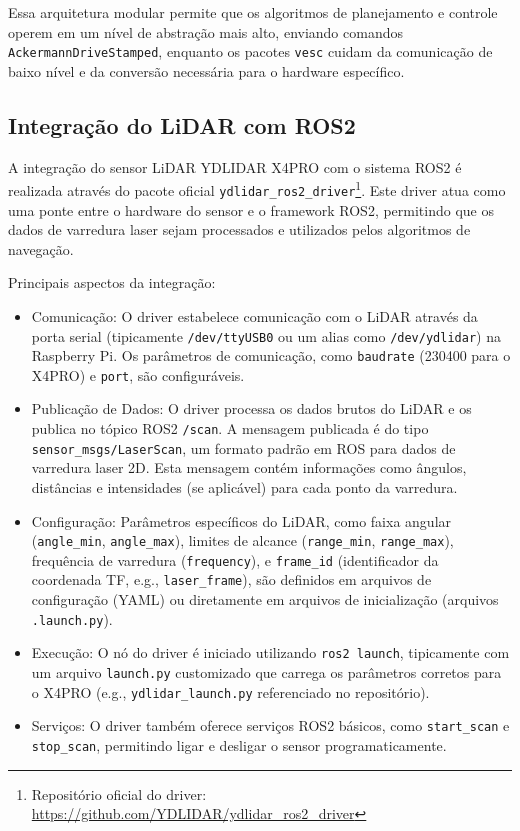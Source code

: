 Essa arquitetura modular permite que os algoritmos de planejamento e controle
operem em um nível de abstração mais alto, enviando comandos
\texttt{AckermannDriveStamped}, enquanto os pacotes \texttt{vesc} cuidam da
comunicação de baixo nível e da conversão necessária para o hardware
específico.

\subsection{Integração do LiDAR com ROS2}

A integração do sensor LiDAR YDLIDAR X4PRO com o sistema ROS2 é realizada
através do pacote oficial \texttt{ydlidar\_ros2\_driver}\footnote{Repositório
      oficial do driver: \url{https://github.com/YDLIDAR/ydlidar_ros2_driver}}. Este
driver atua como uma ponte entre o hardware do sensor e o framework ROS2,
permitindo que os dados de varredura laser sejam processados e utilizados pelos
algoritmos de navegação.

Principais aspectos da integração:
\begin{itemize}
      \item Comunicação: O driver estabelece comunicação com o LiDAR através da porta
            serial (tipicamente \texttt{/dev/ttyUSB0} ou um alias como
            \texttt{/dev/ydlidar}) na Raspberry Pi. Os parâmetros de comunicação, como
            \texttt{baudrate} (230400 para o X4PRO) e \texttt{port}, são configuráveis.
      \item Publicação de Dados: O driver processa os dados brutos do LiDAR e os publica no
            tópico ROS2 \texttt{/scan}. A mensagem publicada é do tipo
            \texttt{sensor\_msgs/LaserScan}, um formato padrão em ROS para dados de
            varredura laser 2D. Esta mensagem contém informações como ângulos, distâncias e
            intensidades (se aplicável) para cada ponto da varredura.
      \item Configuração: Parâmetros específicos do LiDAR, como faixa angular
            (\texttt{angle\_min}, \texttt{angle\_max}), limites de alcance
            (\texttt{range\_min}, \texttt{range\_max}), frequência de varredura
            (\texttt{frequency}), e \texttt{frame\_id} (identificador da coordenada TF,
            e.g., \texttt{laser\_frame}), são definidos em arquivos de configuração (YAML)
            ou diretamente em arquivos de inicialização (arquivos \texttt{.launch.py}).
      \item Execução: O nó do driver é iniciado utilizando \texttt{ros2 launch},
            tipicamente com um arquivo \texttt{launch.py} customizado que carrega os
            parâmetros corretos para o X4PRO (e.g., \texttt{ydlidar\_launch.py}
            referenciado no repositório).
      \item Serviços: O driver também oferece serviços ROS2 básicos, como
            \texttt{start\_scan} e \texttt{stop\_scan}, permitindo ligar e desligar o
            sensor programaticamente.
\end{itemize}

